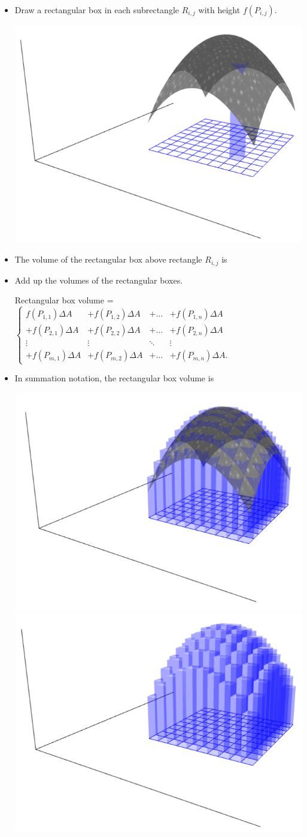 \pagebreak 

\begin{itemize}
    \item Draw a rectangular box in each subrectangle $R_{i,j}$ with height $f(P_{i,j})$.
    \medskip 

    \includegraphics[width=.45\textwidth]{images/mesh2.png}\label{img:sage-double-int-2}
    \medskip 

    \item The volume of the rectangular box above rectangle $R_{i,j}$ is %
    \item Add up the volumes of the rectangular boxes. \medskip 
    
    Rectangular box volume = $\left\{\begin{array}{cccc}
    f(P_{1,1})\Delta A &+ f(P_{1,2})\Delta A &+ \dots &+ f(P_{1,n})\Delta A \\ 
    +f(P_{2,1})\Delta A &+ f(P_{2,2})\Delta A &+ \dots &+ f(P_{2,n})\Delta A \\ 
    \vdots & \vdots & \ddots & \vdots \\ 
    +f(P_{m,1})\Delta A &+ f(P_{m,2})\Delta A &+ \dots &+f(P_{m,n})\Delta A.\end{array}\right.$
    \medskip 
    
    \item In summation notation, the rectangular box volume is
    \vspace{1in}
    
    \includegraphics[width=.45\textwidth]{images/mesh3.png}
    \hfill 
    \includegraphics[width=.45\textwidth]{images/mesh4.png}
    

\end{itemize}
